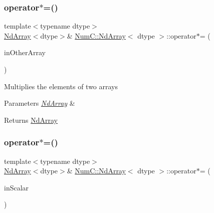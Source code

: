 \subsubsection{\texorpdfstring{operator$\ast$=()}{operator*=()}\hspace{0.1cm}{\footnotesize\ttfamily [1/2]}}
{\footnotesize\ttfamily template$<$typename dtype$>$ \\
\mbox{\hyperlink{class_num_c_1_1_nd_array}{Nd\+Array}}$<$dtype$>$\& \mbox{\hyperlink{class_num_c_1_1_nd_array}{Num\+C\+::\+Nd\+Array}}$<$ dtype $>$\+::operator$\ast$= (\begin{DoxyParamCaption}\item[{const \mbox{\hyperlink{class_num_c_1_1_nd_array}{Nd\+Array}}$<$ dtype $>$ \&}]{in\+Other\+Array }\end{DoxyParamCaption})\hspace{0.3cm}{\ttfamily [inline]}}

Multiplies the elements of two arrays


\begin{DoxyParams}{Parameters}
{\em \mbox{\hyperlink{class_num_c_1_1_nd_array}{Nd\+Array}}} & \\
\hline
\end{DoxyParams}
\begin{DoxyReturn}{Returns}
\mbox{\hyperlink{class_num_c_1_1_nd_array}{Nd\+Array}} 
\end{DoxyReturn}
\mbox{\label{class_num_c_1_1_nd_array_ac6da3d583de0971629230e8d612dacb5}} 
\subsubsection{\texorpdfstring{operator$\ast$=()}{operator*=()}\hspace{0.1cm}{\footnotesize\ttfamily [2/2]}}
{\footnotesize\ttfamily template$<$typename dtype$>$ \\
\mbox{\hyperlink{class_num_c_1_1_nd_array}{Nd\+Array}}$<$dtype$>$\& \mbox{\hyperlink{class_num_c_1_1_nd_array}{Num\+C\+::\+Nd\+Array}}$<$ dtype $>$\+::operator$\ast$= (\begin{DoxyParamCaption}\item[{dtype}]{in\+Scalar }\end{DoxyParamCaption})\hspace{0.3cm}{\ttfamily [inline]}}

